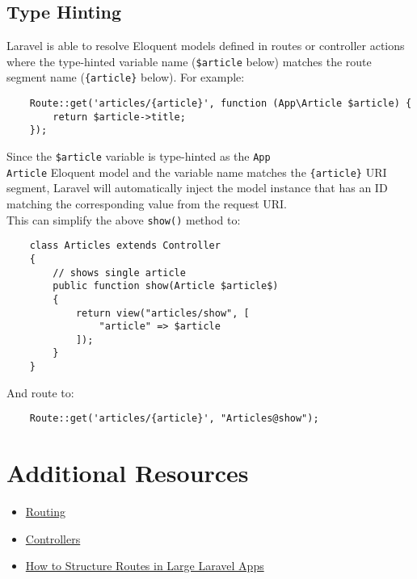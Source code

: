 \subsection{Type Hinting}

Laravel is able to resolve Eloquent models defined in routes or controller actions where the type-hinted variable name (\texttt{\$article} below) matches the route segment name (\texttt{\{article\}} below). For example:

\begin{verbatim}
    Route::get('articles/{article}', function (App\Article $article) {
        return $article->title;
    });
\end{verbatim}

Since the \texttt{\$article} variable is type-hinted as the \texttt{App\\Article} Eloquent model and the variable name matches the \texttt{\{article\}} URI segment, Laravel will automatically inject the model instance that has an ID matching the corresponding value from the request URI.
\\

This can simplify the above \texttt{show()} method to:

\begin{verbatim}
    class Articles extends Controller
    {
        // shows single article
        public function show(Article $article$)
        {
            return view("articles/show", [
                "article" => $article
            ]);
        }
    }
\end{verbatim}

And route to:

\begin{verbatim}
    Route::get('articles/{article}', "Articles@show");
\end{verbatim}

\section{Additional Resources}

\begin{itemize}[leftmargin=*]
    \item \href{https://laravel.com/docs/master/routing}{Routing}
    \item \href{http://laravel.com/docs/master/controllers}{Controllers}
    \item \href{https://laraveldaily.com/how-to-structure-routes-in-large-laravel-projects/}{How to Structure Routes in Large Laravel Apps}
\end{itemize}
